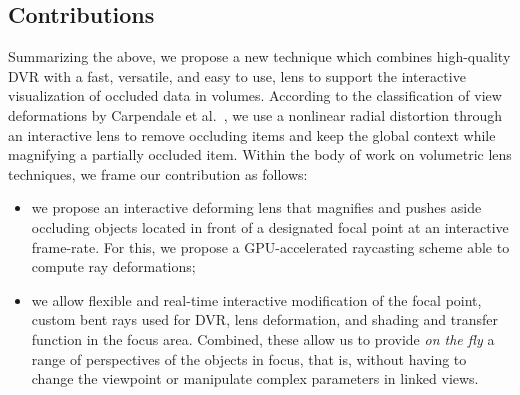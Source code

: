 \subsection{Contributions}
%
Summarizing the above, we propose a new technique which combines high-quality DVR with a fast, versatile, and easy to use, lens to support the interactive visualization of occluded data in volumes. According to the classification of view deformations by Carpendale et al.~\cite{595268}, we use a nonlinear radial distortion through an interactive lens to remove occluding items and keep the global context while magnifying a partially occluded item. Within the body of work on volumetric lens techniques, we frame our contribution as follows:
\begin{itemize}
\item we propose an interactive deforming lens that magnifies and pushes aside occluding objects located in front of a designated focal point at an interactive frame-rate. For this, we propose a GPU-accelerated raycasting scheme able to compute ray deformations;
\item we allow flexible and real-time interactive modification of the focal point, custom bent rays used for DVR, lens deformation, and shading and transfer function in the focus area. Combined, these allow us to provide \emph{on the fly} a range of perspectives of the objects in focus, that is, without having to change the viewpoint or manipulate complex parameters in linked views.
\end{itemize}


